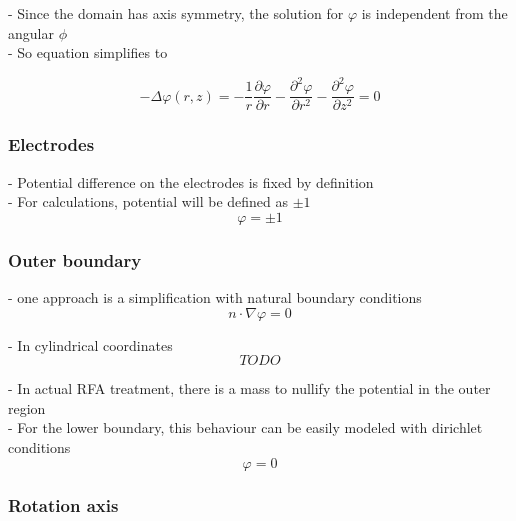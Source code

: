 \documentclass[parskip=half, titlepage=yes, 12pt, BCOR=12mm, DIV=calc]{scrartcl}
\begin{document}
- Since the domain has axis symmetry, the solution for $\varphi$ is independent from the angular $\phi$ \\
- So equation simplifies to 

\begin{equation}
    - \Delta \varphi(r,z) = - \frac{1}{r} \frac{\partial \varphi}{\partial r} - \frac{\partial^2 \varphi}{\partial r^2} - \frac{\partial^2 \varphi}{\partial z^2} = 0
\end{equation}


\subsubsection{Electrodes}

- Potential difference on the electrodes is fixed by definition \\
- For calculations, potential will be defined as $\pm 1$ \\

\begin{equation}
    \varphi = \pm 1
\end{equation}


\subsubsection{Outer boundary}

- one approach is a simplification with natural boundary conditions \\

\begin{equation}
    n \cdot \nabla \varphi = 0
\end{equation}

- In cylindrical coordinates
\begin{equation}
    TODO
\end{equation}


- In actual RFA treatment, there is a mass to nullify the potential in the outer region \\
- For the lower boundary, this behaviour can be easily modeled with dirichlet conditions \\

\begin{equation}
    \varphi = 0
\end{equation}


\subsubsection{Rotation axis}
\end{document}
